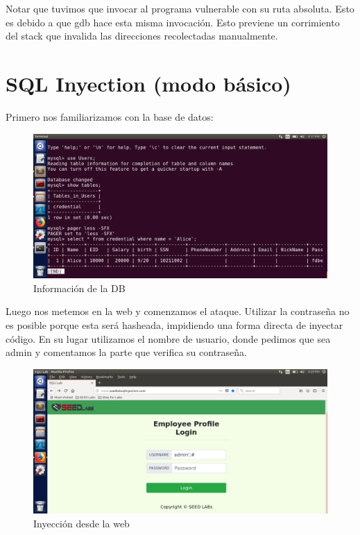 \documentclass[12pt]{article}
\begin{document}
Notar que tuvimos que invocar al programa vulnerable con su ruta absoluta. Esto es debido a que gdb hace esta misma invocación. Esto previene un corrimiento del stack que invalida las direcciones recolectadas manualmente.

\newpage

\section*{SQL Inyection (modo básico)}

Primero nos familiarizamos con la base de datos:

\begin{figure}[h!]
    \centering
    \includegraphics[width=0.9\linewidth]{sqlplay.png}
    \caption{Información de la DB}
    \label{fig:enter-label}
\end{figure}

Luego nos metemos en la web y comenzamos el ataque. Utilizar la contraseña no es posible porque esta será hasheada, impidiendo una forma directa de inyectar código. En su lugar utilizamos el nombre de usuario, donde pedimos que sea admin y comentamos la parte que verifica su contraseña.

\begin{figure}[h!]
    \centering
    \includegraphics[width=0.9\linewidth]{injection.png}
    \caption{Inyección desde la web}
    \label{fig:enter-label}
\end{figure}
\end{document}
